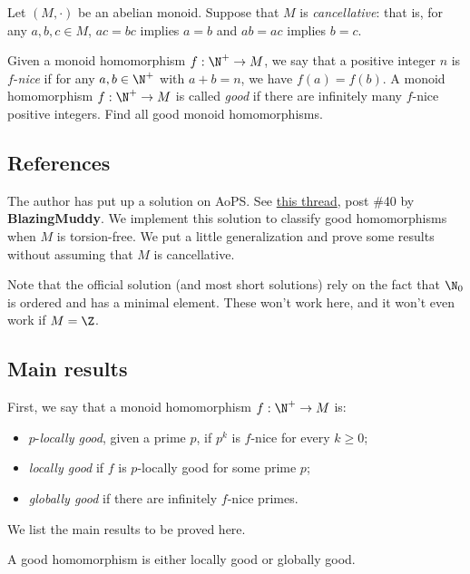 Let $(M, \cdot)$ be an abelian monoid.
Suppose that $M$ is \textit{cancellative}: that is, for any $a, b, c \in M$, $ac = bc$ implies $a = b$ and $ab = ac$ implies $b = c$.

Given a monoid homomorphism $f : \N^+ \to M$, we say that a positive integer $n$ is $f$-\textit{nice} if for any $a, b \in \N^+$ with $a + b = n$, we have $f(a) = f(b)$.
A monoid homomorphism $f : \N^+ \to M$ is called \textit{good} if there are infinitely many $f$-nice positive integers.
Find all good monoid homomorphisms.



\subsection*{References}

The author has put up a solution on AoPS.
See \href{https://artofproblemsolving.com/community/c6h2625925p29340833}{this thread}, post \#40 by \textbf{BlazingMuddy}.
We implement this solution to classify good homomorphisms when $M$ is torsion-free.
We put a little generalization and prove some results without assuming that $M$ is cancellative.

Note that the official solution (and most short solutions) rely on the fact that $\N_0$ is ordered and has a minimal element.
These won't work here, and it won't even work if $M = \Z$.



\subsection*{Main results}

First, we say that a monoid homomorphism $f : \N^+ \to M$ is:
\begin{itemize}
    \item   $p$-\textit{locally good}, given a prime $p$, if $p^k$ is $f$-nice for every $k \geq 0$;
    \item   \textit{locally good} if $f$ is $p$-locally good for some prime $p$;
    \item   \textit{globally good} if there are infinitely $f$-nice primes.
\end{itemize}

We list the main results to be proved here.

\begin{theorem}\label{2020n5-main1}
A good homomorphism is either locally good or globally good.
\end{theorem}

